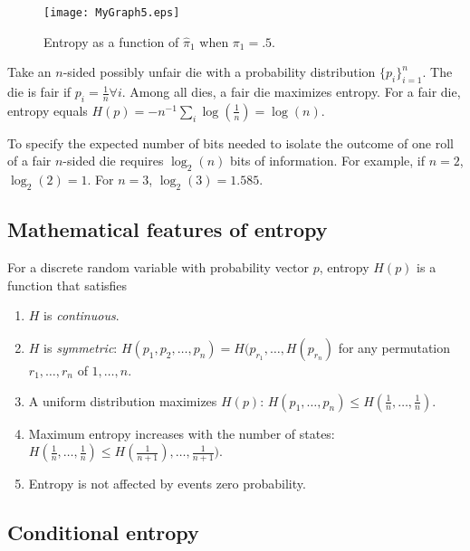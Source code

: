 \begin{subappendices}
\begin{figure}[htp]
\label{fig:simple_entropy}
\centering
\texttt{[image: MyGraph5.eps]}
\caption[Entropy]{Entropy as a function of $\hat \pi_1$ when $\pi_1 = .5$.}\label{fig_entropy_I2}
\end{figure}

\begin{example}
Take an $n$-sided possibly unfair die with  a probability distribution $\{p_i\}_{i=1}^n$.
The die is fair if $p_i = \frac{1}{n} \forall i$.  Among all dies, a fair die  maximizes entropy.  For a fair die,
entropy equals $H(p) = - n^{-1} \sum_i \log \left( \frac{1}{n} \right) = \log(n)$.
\end{example}

\begin{remark}
To specify the expected number of bits needed to isolate the outcome of one roll of a fair $n$-sided die requires $\log_2 (n)$ bits of information.  For example,
if $n=2$, $\log_2(2) =1$.  For $n=3$, $\log_2(3) = 1.585$.
\end{remark}



\subsection{Mathematical features of entropy}

For a discrete random variable with probability vector $p$, entropy $H(p)$ is
a function that satisfies
\begin{enumerate}
\item $H$ is {\em continuous}.
\item $H$ is {\em symmetric}: $H(p_1, p_2, \ldots, p_n) = H(p_{r_1}, \ldots, H(p_{r_n})$ for any
permutation $r_1, \ldots, r_n$ of $1,\ldots, n$.
\item A uniform distribution maximizes $H(p)$:
$ H(p_1, \ldots, p_n) \leq H(\frac{1}{n}, \ldots, \frac{1}{n}) .$
\item Maximum entropy increases with the number of states:
$ H(\frac{1}{n}, \ldots, \frac{1}{n} ) \leq H(\frac{1}{n+1}) , \ldots, \frac{1}{n+1})$.
\item Entropy is not affected by events zero probability.
\end{enumerate}

\subsection{Conditional entropy}


\end{subappendices}
